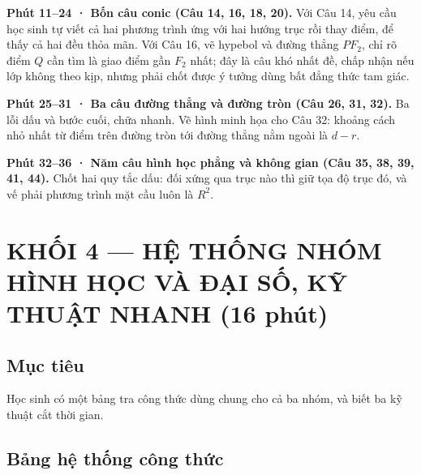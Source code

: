 \documentclass[11pt, a4paper]{article}
\begin{document}
\textbf{Phút 11–24 · Bốn câu conic (Câu 14, 16, 18, 20).} Với Câu 14, yêu cầu học sinh tự viết cả hai phương trình ứng với hai hướng trục rồi thay điểm, để thấy cả hai đều thỏa mãn. Với Câu 16, vẽ hypebol và đường thẳng $PF_2$, chỉ rõ điểm $Q$ cần tìm là giao điểm gần $F_2$ nhất; đây là câu khó nhất đề, chấp nhận nếu lớp không theo kịp, nhưng phải chốt được ý tưởng dùng bất đẳng thức tam giác.

\textbf{Phút 25–31 · Ba câu đường thẳng và đường tròn (Câu 26, 31, 32).} Ba lỗi dấu và bước cuối, chữa nhanh. Vẽ hình minh họa cho Câu 32: khoảng cách nhỏ nhất từ điểm trên đường tròn tới đường thẳng nằm ngoài là $d-r$.

\textbf{Phút 32–36 · Năm câu hình học phẳng và không gian (Câu 35, 38, 39, 41, 44).} Chốt hai quy tắc dấu: đối xứng qua trục nào thì giữ tọa độ trục đó, và vế phải phương trình mặt cầu luôn là $R^2$.

\section{KHỐI 4 — HỆ THỐNG NHÓM HÌNH HỌC VÀ ĐẠI SỐ, KỸ THUẬT NHANH (16 phút)}

\subsection{Mục tiêu}

Học sinh có một bảng tra công thức dùng chung cho cả ba nhóm, và biết ba kỹ thuật cắt thời gian.

\subsection{Bảng hệ thống công thức}

\end{document}

